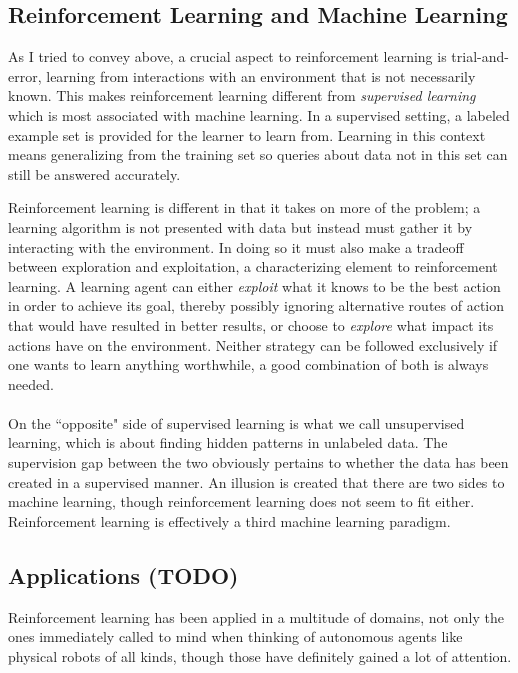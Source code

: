 \subsection{Reinforcement Learning and Machine Learning}
As I tried to convey above,
a crucial aspect to reinforcement learning
is trial-and-error, learning from interactions
with an environment that is not necessarily known.
This makes reinforcement learning different from
\textit{supervised learning}
which is most associated with machine learning.
In a supervised setting,
a labeled example set is provided
for the learner to learn from.
Learning in this context means generalizing from the training set
so queries about data not in this set
can still be answered accurately.

Reinforcement learning is different
in that it takes on more of the problem;
a learning algorithm is not presented with data
but instead must gather it by interacting with the environment.
In doing so it must also make a tradeoff between exploration and exploitation,
a characterizing element to reinforcement learning.
A learning agent can either \textit{exploit}
what it knows to be the best action in order to achieve its goal,
thereby possibly ignoring alternative routes of action
that would have resulted in better results,
or choose to \textit{explore}
what impact its actions have on the environment.
Neither strategy can be followed exclusively
if one wants to learn anything worthwhile,
a good combination of both is always needed.

\paragraph{}
On the ``opposite" side of supervised learning
is what we call unsupervised learning,
which is about finding hidden patterns in unlabeled data.
The supervision gap between the two obviously pertains
to whether the data has been created in a supervised manner.
An illusion is created that there are two sides to machine learning,
though reinforcement learning does not seem to fit either.
Reinforcement learning is effectively a third machine learning paradigm.

\subsection{Applications (TODO)}
Reinforcement learning has been applied in a multitude of domains,
not only the ones immediately called to mind when thinking
of autonomous agents like physical robots of all kinds,
though those have definitely gained a lot of attention.

